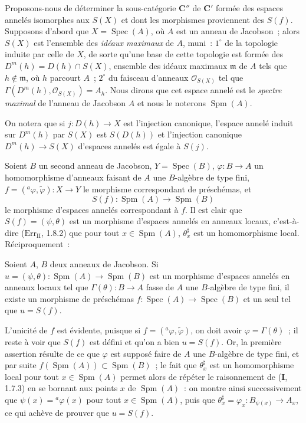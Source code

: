 \begin{env}[10.9.3]
\label{IV.10.9.3-fr}
Proposons-nous de déterminer la sous-catégorie $\mathbf C''$ de $\mathbf C'$
formée des espaces annelés isomorphes aux $S(X)$ et dont les morphismes
proviennent des $S(f)$. Supposons d'abord que $X=\operatorname{Spec}(A)$, où
$A$ est un anneau de Jacobson~; alors $S(X)$ est l'ensemble des \emph{idéaux
maximaux} de $A$, muni~: $1^\circ$ de la topologie induite par celle de $X$, de
sorte qu'une base de cette topologie est formée des
$D^m(h)=D(h)\cap S(X)$, ensemble des idéaux maximaux $\mathfrak m$ de $A$ tels
que $h\notin\mathfrak m$, où $h$ parcourt $A$~; $2^\circ$ du faisceau d'anneaux
$\mathcal O_{S(X)}$ tel que
$\Gamma(D^m(h),\mathcal O_{S(X)})=A_h$. Nous dirons que cet espace annelé est
le \emph{spectre maximal} de l'anneau de Jacobson $A$ et nous le noterons
$\operatorname{Spm}(A)$.

On notera que si $j:D(h)\to X$ est l'injection canonique, l'espace annelé
induit sur $D^m(h)$ par $S(X)$ est $S(D(h))$ et l'injection canonique
$D^m(h)\to S(X)$ d'espaces annelés est égale à $S(j)$.

Soient $B$ un second anneau de Jacobson, $Y=\operatorname{Spec}(B)$,
$\varphi:B\to A$ un homomorphisme d'anneaux faisant de $A$ une $B$-algèbre de
type fini, $f=({}^a\varphi,\widetilde\varphi):X\to Y$ le morphisme
correspondant de préschémas, et
\[
  S(f):\operatorname{Spm}(A)\longrightarrow\operatorname{Spm}(B)
\]
le morphisme d'espaces annelés correspondant à $f$. Il est clair que
$S(f)=(\psi,\theta)$ est un morphisme d'espaces annelés en anneaux locaux,
c'est-à-dire ($\mathrm{Err}_{\mathrm{II}}$, 1.8.2) que pour tout
$x\in\operatorname{Spm}(A)$, $\theta_x^\sharp$ est un homomorphisme local.
Réciproquement~:
\end{env}

\begin{proposition}[10.9.4]
\label{IV.10.9.4-fr}
Soient $A$, $B$ deux anneaux de Jacobson. Si
$u=(\psi,\theta):\operatorname{Spm}(A)\to\operatorname{Spm}(B)$ est un
morphisme d'espaces annelés en anneaux locaux tel que
$\Gamma(\theta):B\to A$ fasse de $A$ une $B$-algèbre de type fini, il existe
un morphisme de préschémas
$f:\operatorname{Spec}(A)\to\operatorname{Spec}(B)$ et un seul tel que
$u=S(f)$.
\end{proposition}

L'unicité de $f$ est évidente, puisque si
$f=({}^a\varphi,\widetilde\varphi)$, on doit avoir
$\varphi=\Gamma(\theta)$~; il reste à voir que $S(f)$ est défini et qu'on a
bien $u=S(f)$. Or, la première assertion résulte de ce que $\varphi$ est
supposé faire de $A$ une $B$-algèbre de type fini, et par suite
$f(\operatorname{Spm}(A))\subset\operatorname{Spm}(B)$~; le fait que
$\theta_x^\sharp$ est un homomorphisme local pour tout
$x\in\operatorname{Spm}(A)$ permet alors de répéter le raisonnement de
(\textbf I, 1.7.3) en se bornant aux points $x$ de $\operatorname{Spm}(A)$~:
on montre ainsi successivement que $\psi(x)={}^a\varphi(x)$ pour tout
$x\in\operatorname{Spm}(A)$, puis que
$\theta_x^\sharp=\varphi_x:B_{\psi(x)}\to A_x$, ce qui achève de prouver que
$u=S(f)$.

